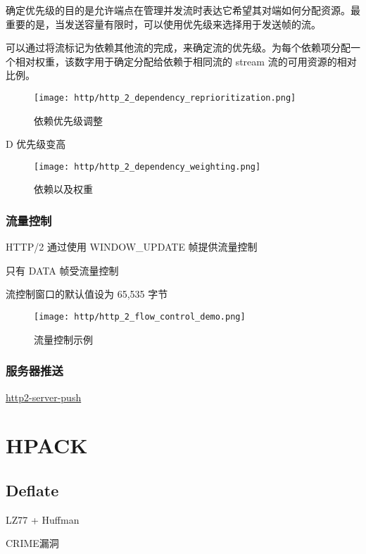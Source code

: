 确定优先级的目的是允许端点在管理并发流时表达它希望其对端如何分配资源。最重要的是，当发送容量有限时，可以使用优先级来选择用于发送帧的流。

可以通过将流标记为依赖其他流的完成，来确定流的优先级。为每个依赖项分配一个相对权重，该数字用于确定分配给依赖于相同流的 stream 流的可用资源的相对比例。


\begin{figure}[H]
    \centering
    \texttt{[image: http/http\_2\_dependency\_reprioritization.png]}
    \caption{依赖优先级调整}
\end{figure}

D 优先级变高


\begin{figure}[H]
    \centering
    \texttt{[image: http/http\_2\_dependency\_weighting.png]}
    \caption{依赖以及权重}
\end{figure}


\subsubsection{流量控制}

HTTP/2 通过使用 WINDOW\_UPDATE 帧提供流量控制

只有 DATA 帧受流量控制

流控制窗口的默认值设为 65,535 字节

\begin{figure}[H]
    \centering
    \texttt{[image: http/http\_2\_flow\_control\_demo.png]}
    \caption{流量控制示例}
\end{figure}


\subsubsection{服务器推送}

\href{https://www.nginx.com/blog/nginx-1-13-9-http2-server-push/}{http2-server-push}


\section{HPACK}

\subsection{Deflate}

LZ77 + Huffman

CRIME漏洞


